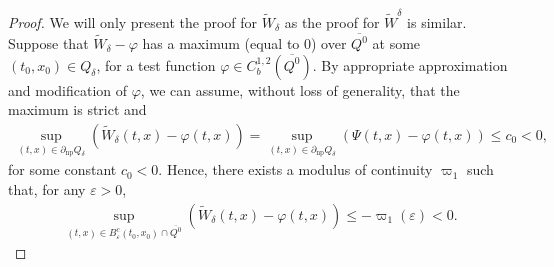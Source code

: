 \documentclass[amscd,amssymb,11pt]{article}
\numberwithin{theorem}{section}
\numberwithin{equation}{section}
\begin{document}
\begin{proof}
We will only present the proof for $\widetilde{W}_{\delta}$ as the proof for $\widetilde{W}^{\delta}$ is similar. Suppose that $\widetilde{W}_{\delta}-\varphi$ has a maximum (equal to $0$) over $\overline{Q^{0}}$ at some $(t_{0},x_{0})\in Q_{\delta}$, for a test function $\varphi\in C_{b}^{1,2}(\overline{Q^{0}})$. By appropriate approximation and modification of $\varphi$, we can assume, without loss of generality, that the maximum is strict and
\begin{align*}
\sup_{(t,x)\in\partial_{\text{np}}Q_{\delta}}\left(\widetilde{W}_{\delta}(t,x)-\varphi(t,x)\right)=\sup_{(t,x)\in\partial_{\text{np}}Q_\delta}\left(\Psi(t,x)-\varphi(t,x)\right)\leq c_{0}<0,
\end{align*}
for some constant $c_{0}<0$. Hence, there exists a modulus of continuity $\varpi_{1}$ such that, for any $\varepsilon>0$,
\begin{align*}
\sup_{(t,x)\in B_{\varepsilon}^{c}(t_{0},x_{0})\cap \overline{Q^{0}}}\left(\widetilde{W}_{\delta}(t,x)-\varphi(t,x)\right)\leq -\varpi_{1}(\varepsilon)<0.
\end{align*}


\end{proof}
\end{document}
